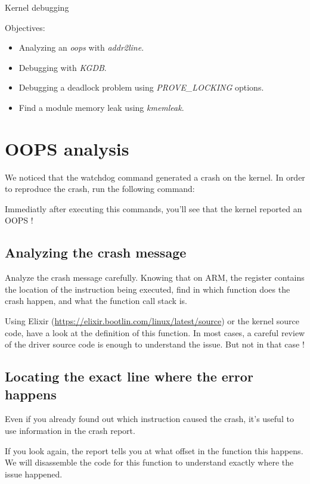 \subchapter
{Kernel debugging}
{Objectives:
  \begin{itemize}
    \item Analyzing an {\em oops} with {\em addr2line}.
    \item Debugging with {\em KGDB}.
    \item Debugging a deadlock problem using {\em PROVE\_LOCKING} options.
    \item Find a module memory leak using {\em kmemleak}.
  \end{itemize}
}

\section{OOPS analysis}
We noticed that the watchdog command generated a crash on the kernel. In order
to reproduce the crash, run the following command:


Immediatly after executing this commands, you'll see that the kernel reported
an OOPS !

\subsection{Analyzing the crash message}

Analyze the crash message carefully. Knowing that on ARM, the 
register contains the location of the instruction being executed, find
in which function does the crash happen, and what the function call
stack is.

Using Elixir (\url{https://elixir.bootlin.com/linux/latest/source}) or the
kernel source code, have a look at the definition of this function. In most
cases, a careful review of the driver source code is enough to understand the
issue. But not in that case !

\subsection{Locating the exact line where the error happens}

Even if you already found out which instruction caused the crash, it's
useful to use information in the crash report.

If you look again, the report tells you at what offset in the function
this happens. We will disassemble the code for this function to understand
exactly where the issue happened.

